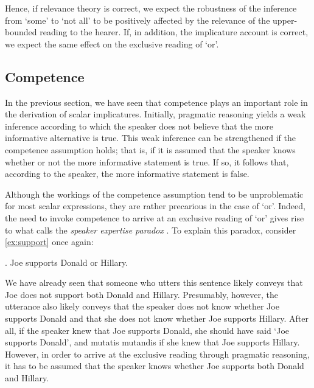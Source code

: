 \documentclass[12pt]{article}
\begin{document}
Hence, if relevance theory is correct, we expect the robustness of the inference from `some' to `not all' to be positively affected by the relevance of the upper-bounded reading to the hearer. If, in addition, the implicature account is correct, we expect the same effect on the exclusive reading of `or'.

\subsection*{Competence}

In the previous section, we have seen that competence plays an important role in the derivation of scalar implicatures. Initially, pragmatic reasoning yields a weak inference according to which the speaker does not believe that the more informative alternative is true. This weak inference can be strengthened if the competence assumption holds; that is, if it is assumed that the speaker knows whether or not the more informative statement is true. If so, it follows that, according to the speaker, the more informative statement is false.

Although the workings of the competence assumption tend to be unproblematic for most scalar expressions, they are rather precarious in the case of `or'. Indeed, the need to invoke competence to arrive at an exclusive reading of `or' gives rise to what \citet{zondervan2010} calls the \emph{speaker expertise paradox} \citep[cf.][]{geurts2006}. To explain this paradox, consider \ref{ex:support} once again:

\ex.	Joe supports Donald or Hillary.

We have already seen that someone who utters this sentence likely conveys that Joe does not support
both Donald and Hillary. Presumably, however, the utterance also likely conveys that the speaker does not know whether
Joe supports Donald and that she does not know whether Joe supports Hillary. After all, if the speaker knew that Joe supports Donald, she should have said `Joe supports Donald', and mutatis mutandis if she knew that Joe supports Hillary. However, in order to arrive at the exclusive reading through pragmatic reasoning, it has to be assumed that the
speaker knows whether Joe supports both Donald and Hillary. 
\end{document}
